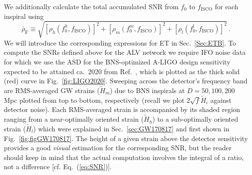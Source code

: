 \documentclass[prd,amsmath,amssymb,aps,floats,amsfonts,notitlepage,superscriptaddress,eqsecnum,nofootinbib,10pt]{revtex4-1}
\newcommand{\be}{\begin{equation}}
\newcommand{\ee}{\end{equation}}
\begin{document}
%
%
We additionally calculate 
the total accumulated SNR from $f_0$ to $f_\text{ISCO}$ for each inspiral using%
\be
\bar{\rho}_\text{F}\equiv\sqrt{\left[{\rho}_h(f_0^h,{f}_\text{ISCO})\right]^2+\left[{\rho}_m(f_0^m,{f}_\text{ISCO})\right]^2+\left[{\rho}_l(f_0^l,{f}_\text{ISCO})\right]^2} \label{eq:SNR_bar_FINAL}\, .
\ee
%
%
We will introduce the corresponding expressions for ET in Sec.~\ref{Sec:ETB}.
To compute the SNRs defined above for the ALV network we require IFO noise data for which
we use the ASD for the BNS-optimized A-LIGO design sensitivity expected to be attained ca.~2020 from Ref.~\cite{LIGO2020},
which is plotted as the thick solid (red) curve in Fig.~\ref{fig:LIGO2020}.
Sweeping across the detector's frequency band are RMS-averaged GW strains ($\tilde{H}_m$) due to BNS inspirals at $D=50,100,200\,$Mpc plotted from top to bottom, respectively (recall we plot $2\sqrt{f}\tilde{H}_i$ against detector noise).
Each RMS-averaged strain is accompanied by its shaded region ranging from a near-optimally oriented strain ($\tilde{H}_h$) to a sub-optimally oriented strain ($\tilde{H}_l$) which were explained in Sec.~\ref{sec:GW170817} and first shown in Fig.~\ref{fig:figGW170817}.
The height of a given strain above the detector sensitivity provides a good \emph{visual} estimation for the corresponding SNR,
but the reader should keep in mind that the actual computation involves the integral of a ratio, not a difference [cf. Eq.~(\ref{eq:SNR})].
%
%
%
\end{document}
